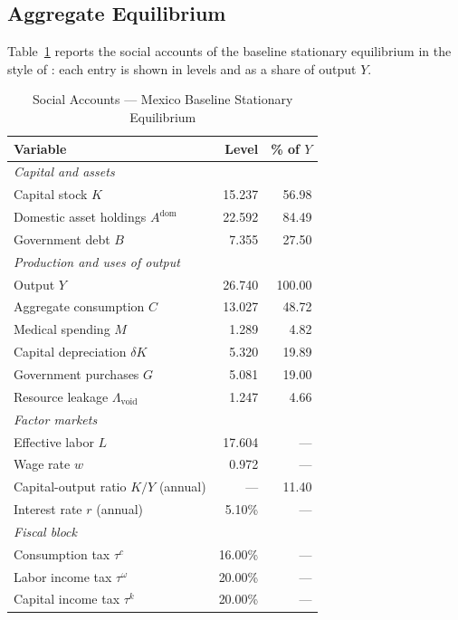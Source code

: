 \documentclass[12pt,a4paper]{article}
\begin{document}
\subsection{Aggregate Equilibrium}
\label{subsec:agg_eq}

Table~\ref{tab:social_accounts} reports the social accounts of the
baseline stationary equilibrium in the style of \citet{FehrKindermann2018}:
each entry is shown in levels and as a share of output $Y$.

\begin{table}[H]
\centering
\caption{Social Accounts --- Mexico Baseline Stationary Equilibrium}
\label{tab:social_accounts}
\begin{tabular}{lrr}
\hline\hline
\textbf{Variable} & \textbf{Level} & \textbf{\% of $Y$} \\
\hline
\multicolumn{3}{l}{\textit{Capital and assets}} \\
Capital stock $K$            & 15.237 & 56.98 \\
Domestic asset holdings $A^{\text{dom}}$ & 22.592 & 84.49 \\
Government debt $B$          & 7.355  & 27.50 \\
\hline
\multicolumn{3}{l}{\textit{Production and uses of output}} \\
Output $Y$                   & 26.740 & 100.00 \\
Aggregate consumption $C$    & 13.027 & 48.72 \\
Medical spending $M$         & 1.289  & 4.82 \\
Capital depreciation $\delta K$ & 5.320 & 19.89 \\
Government purchases $G$     & 5.081  & 19.00 \\
Resource leakage $\Lambda_{\text{void}}$ & 1.247 & 4.66 \\
\hline
\multicolumn{3}{l}{\textit{Factor markets}} \\
Effective labor $L$          & 17.604 & --- \\
Wage rate $w$                & 0.972  & --- \\
Capital-output ratio $K/Y$ (annual) & --- & 11.40 \\
Interest rate $r$ (annual)   & 5.10\% & --- \\
\hline
\multicolumn{3}{l}{\textit{Fiscal block}} \\
Consumption tax $\tau^{c}$   & 16.00\% & --- \\
Labor income tax $\tau^{\omega}$ & 20.00\% & --- \\
Capital income tax $\tau^{k}$ & 20.00\% & --- \\

\end{tabular}
\end{table}
\end{document}
